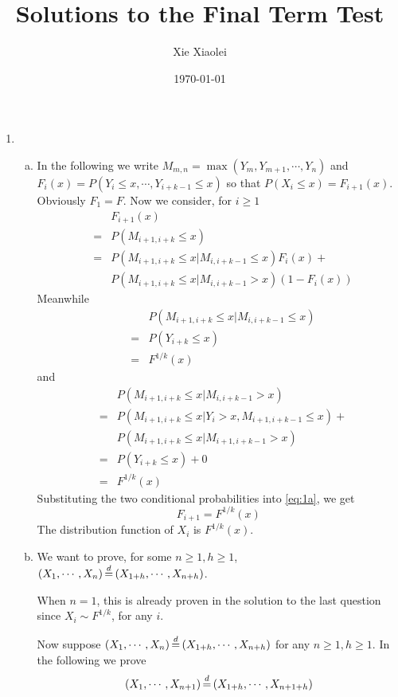 \documentclass{report}
\author{Xie Xiaolei}
\date{\today}
\title{Solutions to the Final Term Test}
\begin{document}
\maketitle

\begin{enumerate}[1.]
\item
  \begin{enumerate}[(a)]
  \item In the following we write $M_{m, n}=\max(Y_m, Y_{m+1}, \cdots,
    Y_n)$ and $F_i(x) = P(Y_i \le x, \cdots, Y_{i+k-1} \le x)$ so that
    $P(X_i \le x) = F_{i+1}(x)$. Obviously $F_1 = F$. Now we consider,
    for $i \ge 1$
    \begin{eqnarray}
      && F_{i+1}(x) \nonumber \\
      &=& P(M_{i+1, i+k} \le x) \nonumber \\
      &=& P(M_{i+1, i+k} \le x | M_{i, i+k-1} \le x) F_i(x) +
      \nonumber \\
      && P(M_{i+1, i+k} \le x | M_{i, i+k-1} > x) (1- F_i(x)) \label{eq:1a}
    \end{eqnarray}
    Meanwhile
    \begin{eqnarray*}
      && P(M_{i+1, i+k} \le x | M_{i, i+k-1} \le x) \\
      &=& P(Y_{i+k} \le x) \\
      &=& F^{1/k}(x)
    \end{eqnarray*}
    and
    \begin{eqnarray*}
      && P(M_{i+1, i+k} \le x | M_{i, i+k-1} > x) \\
      &=& P(M_{i+1, i+k} \le x | Y_i > x, M_{i+1, i+k-1} \le x) + \\
      && P(M_{i+1, i+k} \le x | M_{i+1, i+k-1} > x) \\
      &=& P(Y_{i+k} \le x) + 0 \\
      &=& F^{1/k}(x)
    \end{eqnarray*}
    Substituting the two conditional probabilities into \eqref{eq:1a},
    we get
    \[
    F_{i+1} = F^{1/k}(x)
    \]
    The distribution function of $X_i$ is $F^{1/k}(x)$.

  \item We want to prove, for some $n \ge 1, h \ge 1$, $(X_1, \cdots,
    X_n) \ed (X_{1+h}, \cdots, X_{n+h})$.

    When $n = 1$, this is already proven in the solution to the last
    question since $X_i \sim F^{1/k}$, for any $i$.

    Now suppose $(X_1, \cdots, X_n) \ed (X_{1+h}, \cdots, X_{n+h})$
    for any $n \ge 1, h \ge 1$. In the following we prove
    \[
    (X_1, \cdots, X_{n+1}) \ed (X_{1+h}, \cdots, X_{n+1+h})
    \]
    

\end{enumerate}
\end{enumerate}
\end{document}
